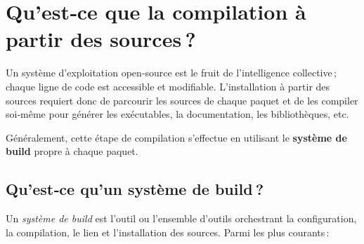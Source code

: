 \section{Qu’est‑ce que la compilation à partir des sources ?}
\label{subsec:compilation-sources}


Un système d’exploitation open‑source est le fruit de l’intelligence collective ; chaque ligne de code est accessible et modifiable. L’installation à partir des sources requiert donc de parcourir les sources de chaque paquet et de les compiler soi‑même pour générer les exécutables, la documentation, les bibliothèques, etc.

Généralement, cette étape de compilation s’effectue en utilisant le \textbf{système de build} propre à chaque paquet.

\subsection{Qu’est‑ce qu’un système de build ?}
\label{sssec:definition-buildsystem}

Un \emph{système de build} est l’outil ou l’ensemble d’outils orchestrant la configuration, la compilation, le lien et l’installation des sources. Parmi les plus courants :


